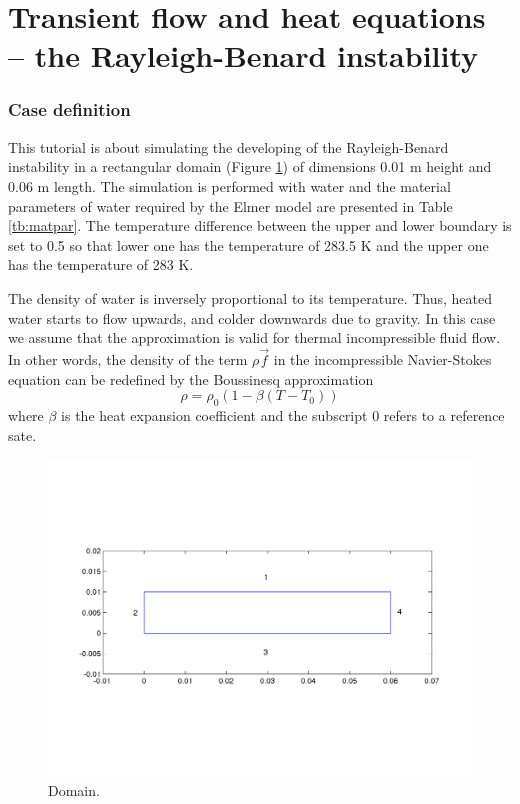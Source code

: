\chapter*{Transient flow and heat equations -- the Rayleigh-Benard instability}


\subsection*{Case definition}

This tutorial is about simulating the developing of the
Rayleigh-Benard instability in a rectangular domain  (Figure
\ref{fg:rb_geometry}) of dimensions 0.01 m height and 0.06 m
length. The simulation is performed with water and the material
parameters of water required by the Elmer model are presented in Table \ref{tb:matpar}. The
temperature difference between the upper and lower boundary is set to
0.5 so that lower one has the temperature of  283.5 K and the upper
one has the temperature of 283 K.


The density of water is inversely proportional to its
temperature. Thus, heated water starts to flow upwards, and colder
downwards due to gravity.  In this case we assume that the
 approximation is valid for thermal incompressible
fluid flow. In other words, the density of the term $\rho$$\vec{f}$ in
the incompressible Navier-Stokes equation can be redefined by the
Boussinesq approximation
\begin{displaymath}
\rho = {\rho}_0(1-\beta(T-{T}_0))
\end{displaymath}
where $\beta$ is the heat expansion coefficient and the subscript 0 refers to a reference sate.


\begin{figure}[h]
\centering
\includegraphics[width=150 mm, height=55 mm]{rb_geometry}
\caption{Domain.}\label{fg:rb_geometry}
\end{figure}  


